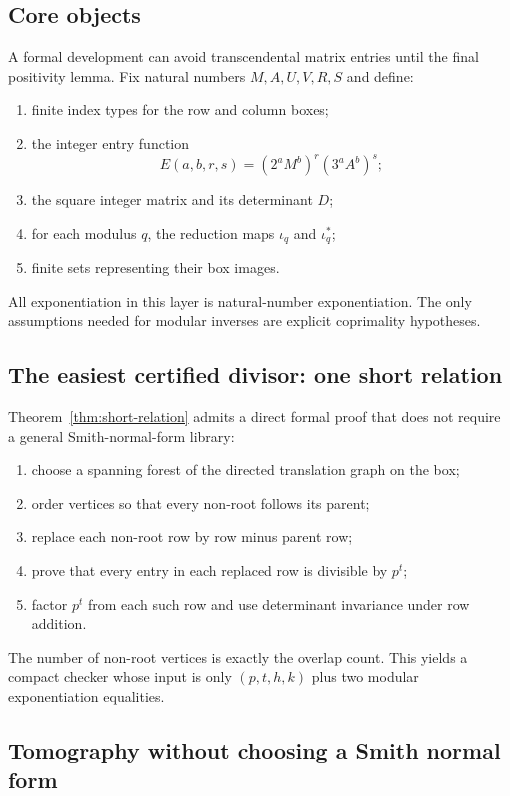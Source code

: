 \documentclass[11pt]{article}
\theoremstyle{definition}
\theoremstyle{remark}
\begin{document}
\subsection{Core objects}

A formal development can avoid transcendental matrix entries until the final positivity lemma.  Fix natural numbers $M,A,U,V,R,S$ and define:
\begin{enumerate}[label=\textup{(F\arabic*)}]
\item finite index types for the row and column boxes;
\item the integer entry function
\[
 E(a,b,r,s)=(2^aM^b)^r(3^aA^b)^s;
\]
\item the square integer matrix and its determinant $D$;
\item for each modulus $q$, the reduction maps $\iota_q$ and $\iota_q^*$;
\item finite sets representing their box images.
\end{enumerate}
All exponentiation in this layer is natural-number exponentiation.  The only assumptions needed for modular inverses are explicit coprimality hypotheses.

\subsection{The easiest certified divisor: one short relation}

Theorem~\ref{thm:short-relation} admits a direct formal proof that does not require a general Smith-normal-form library:
\begin{enumerate}[label=\textup{(L\arabic*)}]
\item choose a spanning forest of the directed translation graph on the box;
\item order vertices so that every non-root follows its parent;
\item replace each non-root row by row minus parent row;
\item prove that every entry in each replaced row is divisible by $p^t$;
\item factor $p^t$ from each such row and use determinant invariance under row addition.
\end{enumerate}
The number of non-root vertices is exactly the overlap count.  This yields a compact checker whose input is only $(p,t,h,k)$ plus two modular exponentiation equalities.

\subsection{Tomography without choosing a Smith normal form}
\end{document}
